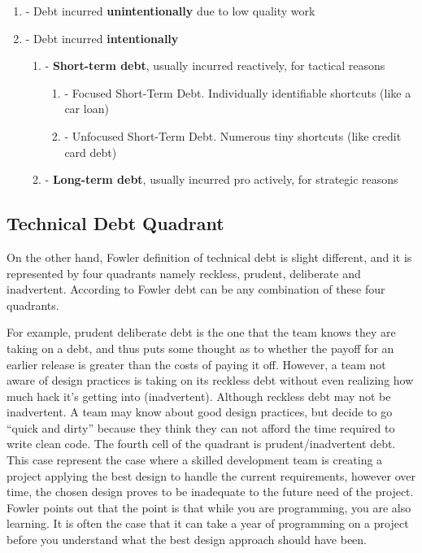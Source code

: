 \begin{enumerate}
    \item - Debt incurred \textbf{unintentionally} due to low quality work
    \item - Debt incurred \textbf{intentionally}
    \begin{enumerate}
        \item - \textbf{Short-term debt}, usually incurred reactively, for tactical reasons
        \begin{enumerate}
            \item - Focused Short-Term Debt. Individually identifiable shortcuts (like a car loan)
            \item - Unfocused Short-Term Debt. Numerous tiny shortcuts (like credit card debt)
        \end{enumerate}
        \item - \textbf{Long-term debt}, usually incurred pro actively, for strategic reasons
    \end{enumerate}
\end{enumerate}

\subsection{Technical Debt Quadrant}

On the other hand, Fowler definition of technical debt is slight different, and it is represented by four quadrants namely reckless, prudent, deliberate and inadvertent. According to Fowler debt can be any combination of these four quadrants. 

For example, prudent deliberate debt is the one that the team knows they are taking on a debt, and thus puts some thought as to whether the payoff for an earlier release is greater than the costs of paying it off. However, a team not aware of design practices is taking on its reckless debt without even realizing how much hack it's getting into (inadvertent). Although reckless debt may not be inadvertent. A team may know about good design practices, but decide to go ``quick and dirty'' because they think they can not afford the time required to write clean code. The fourth cell of the quadrant is prudent/inadvertent debt. This case represent the case where a skilled development team is creating a project applying the best design to handle the current requirements, however over time, the chosen design proves to be inadequate to the future need of the project. Fowler points out that the point is that while you are programming, you are also learning. It is often the case that it can take a year of programming on a project before you understand what the best design approach should have been.  

